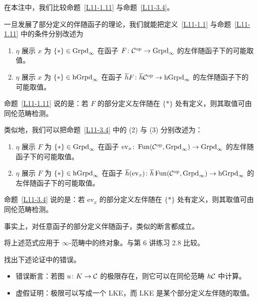 \begin{remark}\label{L11-3.5}
在本注中，我们比较命题~\ref{L11-1.11} 与命题~\ref{L11-3.4}。

一旦发展了部分定义的伴随函子的理论，我们就能把定义~\ref{L11-1.1} 与命题~\ref{L11-1.11} 中的条件分别改述为
\begin{enumerate}[label=(\alph*),leftmargin=2.6em,itemsep=0.2em]
\item $\eta$ 展示 $x$ 为 $\{\ast\}\in\operatorname{Grpd}_\infty$ 在函子 $F\colon\mathcal{C}^{\mathrm{op}}\to\operatorname{Grpd}_\infty$ 的左伴随函子下的可能取值。
\item[(a$'$)] $\eta$ 展示 $x$ 为 $\{\ast\}\in\operatorname{hGrpd}_\infty$ 在函子 $\overline{h}F\colon\overline{h}\mathcal{C}^{\mathrm{op}}\to\operatorname{hGrpd}_\infty$ 的左伴随函子下的可能取值。
\end{enumerate}
命题~\ref{L11-1.11} 说的是：若 $F$ 的部分定义左伴随在 $\{\ast\}$ 处有定义，则其取值可由同伦范畴检测。

类似地，我们可以把命题~\ref{L11-3.4} 中的 (2) 与 (3) 分别改述为：
\begin{enumerate}[label=(\alph*),leftmargin=2.6em,itemsep=0.2em,start=2]
\item $\eta$ 展示 $F$ 为 $\{\ast\}\in\operatorname{Grpd}_\infty$ 在函子 $\mathrm{ev}_x\colon\operatorname{Fun}(\mathcal{C}^{\mathrm{op}},\operatorname{Grpd}_\infty)\to\operatorname{Grpd}_\infty$ 的左伴随函子下的可能取值。
\item[(b$'$)] $\eta$ 展示 $F$ 为 $\{\ast\}\in\operatorname{hGrpd}_\infty$ 在函子 $\overline{h}(\mathrm{ev}_x)\colon\overline{h}\operatorname{Fun}(\mathcal{C}^{\mathrm{op}},\operatorname{Grpd}_\infty)\to\operatorname{hGrpd}_\infty$ 的左伴随函子下的可能取值。
\end{enumerate}
命题~\ref{L11-3.4} 说的是：若 $\mathrm{ev}_x$ 的部分定义左伴随在 $\{\ast\}$ 处有定义，则其取值可由同伦范畴检测。

事实上，对任意函子的部分定义伴随函子，类似的断言都成立。
\end{remark}

\begin{exercise}\label{L11-3.6}
将上述范式应用于 $\infty$-范畴中的终对象。与第 6 讲练习 2.8 比较。
\end{exercise}

\begin{exercise}\label{L11-3.7}
找出下述论证中的错误。
\begin{itemize}[leftmargin=2.2em,itemsep=0.1em]
\item 错误断言：若图 $u\colon K\to\mathcal{C}$ 的极限存在，则它可以在同伦范畴 $h\mathcal{C}$ 中计算。
\item 虚假证明：极限可以写成一个 LKE，而 LKE 是某个部分定义左伴随的取值。
\end{itemize}
\end{exercise}


